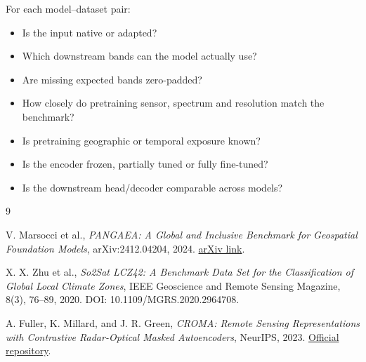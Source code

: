 \documentclass[11pt,a4paper]{article}
\begin{document}
For each model--dataset pair:
\begin{itemize}
    \item Is the input native or adapted?
    \item Which downstream bands can the model actually use?
    \item Are missing expected bands zero-padded?
    \item How closely do pretraining sensor, spectrum and resolution match the benchmark?
    \item Is pretraining geographic or temporal exposure known?
    \item Is the encoder frozen, partially tuned or fully fine-tuned?
    \item Is the downstream head/decoder comparable across models?
\end{itemize}

\begin{thebibliography}{9}

V. Marsocci et al.,
\textit{PANGAEA: A Global and Inclusive Benchmark for Geospatial Foundation Models},
arXiv:2412.04204, 2024.
\href{https://arxiv.org/abs/2412.04204}{arXiv link}.

X. X. Zhu et al.,
\textit{So2Sat LCZ42: A Benchmark Data Set for the Classification of Global Local Climate Zones},
IEEE Geoscience and Remote Sensing Magazine, 8(3), 76--89, 2020.
DOI: 10.1109/MGRS.2020.2964708.

A. Fuller, K. Millard, and J. R. Green,
\textit{CROMA: Remote Sensing Representations with Contrastive Radar-Optical Masked Autoencoders},
NeurIPS, 2023.
\href{https://github.com/antofuller/CROMA}{Official repository}.

\end{thebibliography}
\end{document}
